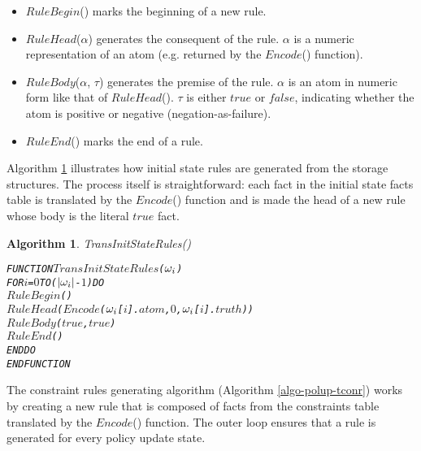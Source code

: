 \documentclass[11pt]{report}
\newenvironment{vverbatim}
{
  \begin{alltt}
}
{
    \vspace{-\baselineskip}
  \end{alltt}
}
\newtheorem{vvalgorithm}{Algorithm}[chapter]
\newenvironment{valgorithm}[2]
{
  \begin{vvalgorithm}{#1}
    \label{#2}
    \small
    \begin{vverbatim}
}
{
    \end{vverbatim}
  \end{vvalgorithm}
}
\begin{document}
          \begin{itemize}
            \item
              $RuleBegin$() marks the beginning of a new rule.
            \item
              $RuleHead$($\alpha$) generates the consequent of the rule.
              $\alpha$ is a numeric representation of an atom (e.g. returned by
              the $Encode$() function).
            \item
              $RuleBody$($\alpha$, $\tau$) generates the premise of the rule.
              $\alpha$ is an atom in numeric form like that of $RuleHead$().
              $\tau$ is either $true$ or $false$, indicating whether the atom
              is positive or negative (negation-as-failure).
            \item
              $RuleEnd$() marks the end of a rule.
          \end{itemize}

          Algorithm \ref{algo-polup-tisr} illustrates how initial state rules
          are generated from the storage structures. The process itself is
          straightforward: each fact in the initial state facts table is
          translated by the $Encode$() function and is made the head of a new
          rule whose body is the literal $true$ fact.

          \begin{valgorithm}{TransInitStateRules()}{algo-polup-tisr}
FUNCTION \(TransInitStateRules\)(\(\omega\sb{i}\))
  FOR \(i\) = \(0\) TO (\(|\omega\sb{i}|\) - \(1\)) DO
    \(RuleBegin\)()
    \(RuleHead\)(\(Encode\)(\(\omega\sb{i}\)[\(i\)].\(atom\), \(0\), \(\omega\sb{i}\)[\(i\)].\(truth\)))
    \(RuleBody\)(\(true\), \(true\))
    \(RuleEnd\)()
  ENDDO
ENDFUNCTION
          \end{valgorithm}

          The constraint rules generating algorithm (Algorithm
          \ref{algo-polup-tconr}) works by creating a new rule that is
          composed of facts from the constraints table translated by the
          $Encode$() function. The outer loop ensures that a rule is
          generated for every policy update state.
\end{document}
